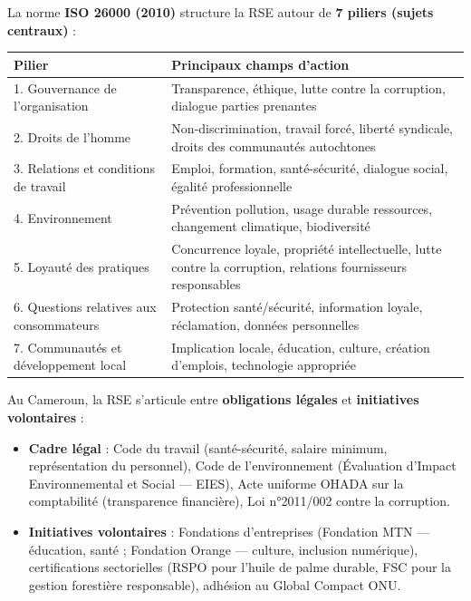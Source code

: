 \documentclass[11pt]{article}
\begin{document}
La norme \textbf{ISO 26000 (2010)} structure la RSE autour de \textbf{7 piliers (sujets centraux)} :

\begin{center}
\begin{tabularx}{\linewidth}{|l|X|}\hline
\textbf{Pilier} & \textbf{Principaux champs d'action} \\\hline
1. Gouvernance de l'organisation & Transparence, éthique, lutte contre la corruption, dialogue parties prenantes \\\hline
2. Droits de l'homme & Non-discrimination, travail forcé, liberté syndicale, droits des communautés autochtones \\\hline
3. Relations et conditions de travail & Emploi, formation, santé-sécurité, dialogue social, égalité professionnelle \\\hline
4. Environnement & Prévention pollution, usage durable ressources, changement climatique, biodiversité \\\hline
5. Loyauté des pratiques & Concurrence loyale, propriété intellectuelle, lutte contre la corruption, relations fournisseurs responsables \\\hline
6. Questions relatives aux consommateurs & Protection santé/sécurité, information loyale, réclamation, données personnelles \\\hline
7. Communautés et développement local & Implication locale, éducation, culture, création d'emplois, technologie appropriée \\\hline
\end{tabularx}
\end{center}

Au Cameroun, la RSE s'articule entre \textbf{obligations légales} et \textbf{initiatives volontaires} :

\begin{itemize}
    \item \textbf{Cadre légal} : Code du travail (santé-sécurité, salaire minimum, représentation du personnel), Code de l'environnement (Évaluation d'Impact Environnemental et Social — EIES), Acte uniforme OHADA sur la comptabilité (transparence financière), Loi n°2011/002 contre la corruption.
    \item \textbf{Initiatives volontaires} : Fondations d'entreprises (Fondation MTN — éducation, santé ; Fondation Orange — culture, inclusion numérique), certifications sectorielles (RSPO pour l'huile de palme durable, FSC pour la gestion forestière responsable), adhésion au Global Compact ONU.
\end{itemize}
\end{document}
